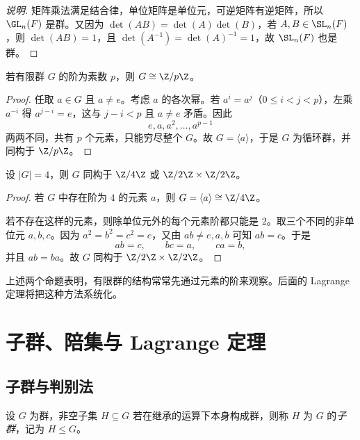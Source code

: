 \begin{proof}[说明]
矩阵乘法满足结合律，单位矩阵是单位元，可逆矩阵有逆矩阵，所以 $\GL_n(F)$ 是群。又因为 $\det(AB)=\det(A)\det(B)$，若 $A,B \in \SL_n(F)$，则 $\det(AB)=1$，且 $\det(A^{-1})=\det(A)^{-1}=1$，故 $\SL_n(F)$ 也是群。
\end{proof}

\begin{proposition}[阶为素数的群是循环群]
若有限群 $G$ 的阶为素数 $p$，则 $G \cong \Z/p\Z$。
\end{proposition}

\begin{proof}
任取 $a\in G$ 且 $a\ne e$。考虑 $a$ 的各次幂。若 $a^i=a^j$（$0\le i<j<p$），左乘 $a^{-i}$ 得 $a^{j-i}=e$，这与 $j-i<p$ 且 $a\ne e$ 矛盾。因此
\[
 e,a,a^2,\dots,a^{p-1}
\]
两两不同，共有 $p$ 个元素，只能穷尽整个 $G$。故 $G=\langle a \rangle$，于是 $G$ 为循环群，并同构于 $\Z/p\Z$。
\end{proof}

\begin{proposition}[阶为 $4$ 的群分类]
设 $|G|=4$，则 $G$ 同构于 $\Z/4\Z$ 或 $\Z/2\Z \times \Z/2\Z$。
\end{proposition}

\begin{proof}
若 $G$ 中存在阶为 $4$ 的元素 $a$，则 $G=\langle a \rangle \cong \Z/4\Z$。

若不存在这样的元素，则除单位元外的每个元素阶都只能是 $2$。取三个不同的非单位元 $a,b,c$。因为 $a^2=b^2=c^2=e$，又由 $ab\ne e,a,b$ 可知 $ab=c$。于是
\[
 ab=c, \qquad bc=a, \qquad ca=b,
\]
并且 $ab=ba$。故 $G$ 同构于 $\Z/2\Z \times \Z/2\Z$。
\end{proof}

\begin{remark}
上述两个命题表明，有限群的结构常常先通过元素的阶来观察。后面的 Lagrange 定理将把这种方法系统化。
\end{remark}

\section{子群、陪集与 Lagrange 定理}

\subsection*{子群与判别法}

\begin{definition}
设 $G$ 为群，非空子集 $H\subseteq G$ 若在继承的运算下本身构成群，则称 $H$ 为 $G$ 的\emph{子群}，记为 $H\le G$。
\end{definition}

